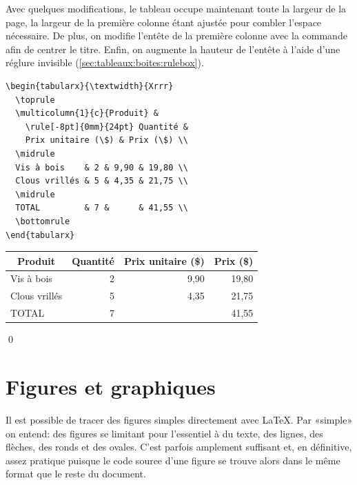 \begin{exemple}
  Avec quelques modifications, le tableau occupe maintenant toute la
  largeur de la page, la largeur de la première colonne étant ajustée
  pour combler l'espace nécessaire. De plus, on modifie l'entête de la
  première colonne avec la commande \cmd{\multicolumn} afin de centrer
  le titre. Enfin, on augmente la hauteur de l'entête à l'aide d'une
  réglure invisible (\autoref{sec:tableaux:boites:rulebox}).
\begin{lstlisting}
\begin{tabularx}{\textwidth}{Xrrr}
  \toprule
  \multicolumn{1}{c}{Produit} &
    \rule[-8pt]{0mm}{24pt} Quantité &
    Prix unitaire (\$) & Prix (\$) \\
  \midrule
  Vis à bois    & 2 & 9,90 & 19,80 \\
  Clous vrillés & 5 & 4,35 & 21,75 \\
  \midrule
  TOTAL         & 7 &      & 41,55 \\
  \bottomrule
\end{tabularx}
\end{lstlisting}
  \begin{center}
    \begin{tabularx}{\textwidth}{Xrrr}
      \toprule
      \multicolumn{1}{c}{Produit} &
      \rule[-8pt]{0mm}{24pt} Quantité & Prix unitaire (\$) & Prix (\$) \\
      \midrule
      Vis à bois    & 2 & 9,90 & 19,80 \\
      Clous vrillés & 5 & 4,35 & 21,75 \\
      \midrule
      TOTAL         & 7 &      & 41,55 \\
      \bottomrule
    \end{tabularx}
  \end{center}
  \qed
\end{exemple}



\section{Figures et graphiques}
\label{sec:tableaux:figures}

Il est possible de tracer des figures simples directement avec {\LaTeX}. Par «simple» on entend: des figures se
limitant  pour l'essentiel à du texte, des lignes, des flèches, des
ronds et des ovales. C'est parfois amplement suffisant et, en
définitive, assez pratique puisque le code source d'une figure se
trouve alors dans le même format que le reste du document.

